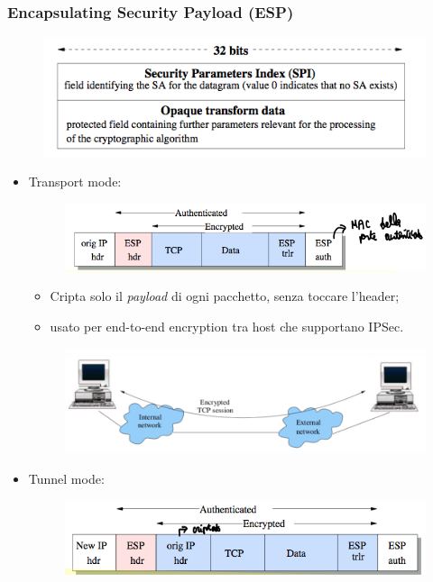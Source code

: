 \documentclass[11pt, a4paper, twoside, italian]{report}
\theoremstyle{plain}
\begin{document}
\subsubsection*{Encapsulating Security Payload (ESP)}
\begin{figure}[H]
	\centering
	\includegraphics[scale=0.8]{espstructure}
\end{figure}
\begin{multicols}{2}
\begin{itemize}
	\item Transport mode:
	\begin{figure}[H]
		\centering
		\includegraphics[scale=0.7]{esptransportmode}
	\end{figure}
		\begin{itemize}
			\item Cripta solo il \textit{payload} di ogni pacchetto, senza toccare l'header;
			\item usato per end-to-end encryption tra host che supportano IPSec.
		\end{itemize}
	\begin{figure}[H]
		\centering
		\includegraphics[scale=0.53]{tras}
	\end{figure}
\columnbreak
	\item Tunnel mode:
		\begin{figure}[H]
			\centering
			\includegraphics[scale=0.7]{esptunnelmode}

\end{figure}
\end{itemize}
\end{multicols}
\end{document}

